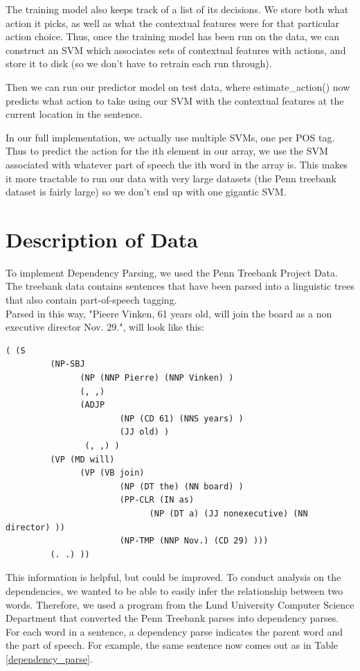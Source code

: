 \documentclass[12pt]{amsart}
\begin{document}
The training model also keeps track of a list of its decisions. We store both
what action it picks, as well as what the contextual features were for that
particular action choice. Thus, once the training model has been run on the
data, we can construct an SVM which associates sets of contextual features 
with actions, and store it to disk (so we don't have to retrain each run
through).

Then we can run our predictor model on test data, where estimate\_action()
now predicts what action to take using our SVM with the contextual
features at the current location in the sentence.

In our full implementation, we actually use multiple SVMs, one per POS tag.
Thus to predict the action for the ith element in our array, we use the SVM
associated with whatever part of speech the ith word in the array is. This
makes it more tractable to run our data with very large datasets (the Penn
treebank dataset is fairly large) so we don't end up with one gigantic SVM.

\section{Description of Data}
To implement Dependency Parsing, we used the Penn Treebank Project Data. The treebank data contains sentences that have been parsed into a linguistic trees that also contain part-of-speech tagging. \\

Parsed in this way, "Pieere Vinken, 61 years old, will join the board as a non executive director Nov. 29.", will look like this: 
\begin{verbatim}
( (S
         (NP-SBJ 
               (NP (NNP Pierre) (NNP Vinken) )
               (, ,) 
               (ADJP
                       (NP (CD 61) (NNS years) )
                       (JJ old) )
                (, ,) )
         (VP (MD will) 
               (VP (VB join) 
                       (NP (DT the) (NN board) )
                       (PP-CLR (IN as) 
                             (NP (DT a) (JJ nonexecutive) (NN director) ))
                       (NP-TMP (NNP Nov.) (CD 29) )))
         (. .) ))\end{verbatim}

This information is helpful, but could be improved. To conduct analysis on the dependencies, we wanted to be able to easily infer the relationship between two words. Therefore, we used a program from the Lund University Computer Science Department that converted the Penn Treebank parses into dependency parses. For each word in a sentence, a dependency parse indicates the parent word and the part of speech. For example, the same sentence now comes out as in Table \ref{dependency_parse}.
\end{document}
